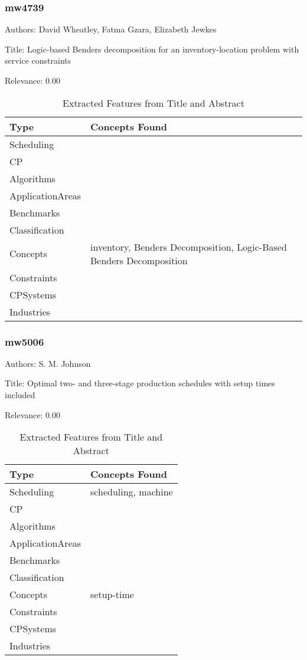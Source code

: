 \subsubsection{mw4739}
\label{mw:mw4739}

Authors: David Wheatley, Fatma Gzara, Elizabeth Jewkes

Title: Logic-based Benders decomposition for an inventory-location problem with service constraints

Relevance:  0.00

{\scriptsize
\begin{longtable}{p{2cm}p{20cm}}
\caption{Extracted Features from Title and Abstract}\\ \toprule
Type & Concepts Found\\ \midrule
\endhead
\bottomrule
\endfoot
Scheduling & \\ 
CP & \\ 
Algorithms & \\ 
ApplicationAreas & \\ 
Benchmarks & \\ 
Classification & \\ 
Concepts & inventory, Benders Decomposition, Logic-Based Benders Decomposition\\ 
Constraints & \\ 
CPSystems & \\ 
Industries & \\ 
\end{longtable}
}



\subsubsection{mw5006}
\label{mw:mw5006}

Authors: S. M. Johnson

Title: Optimal two‐ and three‐stage production schedules with setup times included

Relevance:  0.00

{\scriptsize
\begin{longtable}{p{2cm}p{20cm}}
\caption{Extracted Features from Title and Abstract}\\ \toprule
Type & Concepts Found\\ \midrule
\endhead
\bottomrule
\endfoot
Scheduling & scheduling, machine\\ 
CP & \\ 
Algorithms & \\ 
ApplicationAreas & \\ 
Benchmarks & \\ 
Classification & \\ 
Concepts & setup-time\\ 
Constraints & \\ 
CPSystems & \\ 
Industries & \\ 
\end{longtable}
}

